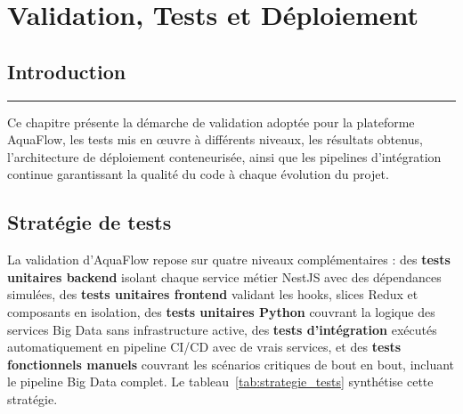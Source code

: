 \chapter{\textbf{Validation, Tests et Déploiement}}
\vspace{-0.7cm}

\section*{Introduction}
\vspace{-0.6cm}
\noindent\rule{\textwidth}{0.2pt}
\vspace{0.05cm}
\large

Ce chapitre présente la démarche de validation adoptée pour la plateforme AquaFlow,
les tests mis en œuvre à différents niveaux, les résultats obtenus, l'architecture de déploiement
conteneurisée, ainsi que les pipelines d'intégration continue garantissant la
qualité du code à chaque évolution du projet.

\normalsize
\vspace{-0.5cm}

\section{Stratégie de tests}

La validation d'AquaFlow repose sur quatre niveaux complémentaires : des
\textbf{tests unitaires backend} isolant chaque service métier NestJS avec des dépendances
simulées, des \textbf{tests unitaires frontend} validant les hooks, slices Redux et composants
en isolation, des \textbf{tests unitaires Python} couvrant la logique des services Big Data
sans infrastructure active, des \textbf{tests d'intégration} exécutés automatiquement
en pipeline CI/CD avec de vrais services, et des \textbf{tests fonctionnels
manuels} couvrant les scénarios critiques de bout en bout, incluant le pipeline Big Data complet.
Le tableau~\ref{tab:strategie_tests} synthétise cette stratégie.

